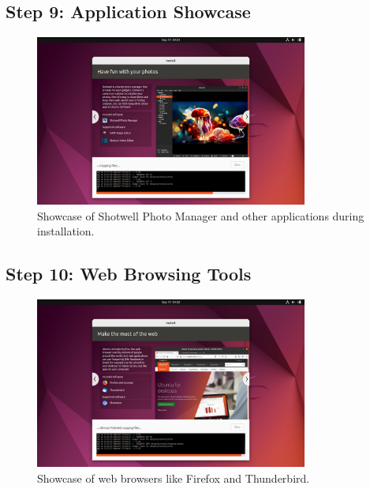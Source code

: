 \documentclass{article}
\begin{document}
\subsection{Step 9: Application Showcase}
\begin{figure}[H]
    \centering
    \includegraphics[width=0.8\textwidth]{2024-09-17_04-31-37.png}
    \caption{Showcase of Shotwell Photo Manager and other applications during installation.}
\end{figure}

\subsection{Step 10: Web Browsing Tools}
\begin{figure}[H]
    \centering
    \includegraphics[width=0.8\textwidth]{2024-09-17_04-32-41.png}
    \caption{Showcase of web browsers like Firefox and Thunderbird.}
\end{figure}
\end{document}
